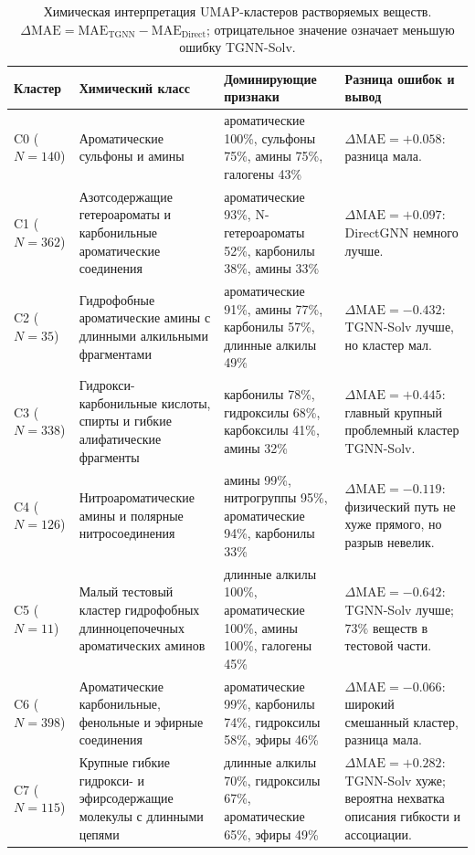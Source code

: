 \documentclass[11pt]{article}
\newcommand{\mae}{\mathrm{MAE}}
\theoremstyle{definition}
\begin{document}
\begin{table}[!htbp]
\centering
\caption{Химическая интерпретация UMAP-кластеров растворяемых веществ. \(\Delta\mae=\mae_{\mathrm{TGNN}}-\mae_{\mathrm{Direct}}\); отрицательное значение означает меньшую ошибку TGNN-Solv.}
\label{tab:umap-cluster-classes}
\footnotesize
\begin{tabularx}{\textwidth}{C{0.12\textwidth} P{0.31\textwidth} P{0.30\textwidth} Y}
\toprule
Кластер & Химический класс & Доминирующие признаки & Разница ошибок и вывод \\
\midrule
C0 (\(N=140\)) & Ароматические сульфоны и амины & ароматические 100\%, сульфоны 75\%, амины 75\%, галогены 43\% & \(\Delta\mae=+0.058\): разница мала. \\
C1 (\(N=362\)) & Азотсодержащие гетероароматы и карбонильные ароматические соединения & ароматические 93\%, N-гетероароматы 52\%, карбонилы 38\%, амины 33\% & \(\Delta\mae=+0.097\): DirectGNN немного лучше. \\
C2 (\(N=35\)) & Гидрофобные ароматические амины с длинными алкильными фрагментами & ароматические 91\%, амины 77\%, карбонилы 57\%, длинные алкилы 49\% & \(\Delta\mae=-0.432\): TGNN-Solv лучше, но кластер мал. \\
C3 (\(N=338\)) & Гидрокси-карбонильные кислоты, спирты и гибкие алифатические фрагменты & карбонилы 78\%, гидроксилы 68\%, карбоксилы 41\%, амины 32\% & \(\Delta\mae=+0.445\): главный крупный проблемный кластер TGNN-Solv. \\
C4 (\(N=126\)) & Нитроароматические амины и полярные нитросоединения & амины 99\%, нитрогруппы 95\%, ароматические 94\%, карбонилы 33\% & \(\Delta\mae=-0.119\): физический путь не хуже прямого, но разрыв невелик. \\
C5 (\(N=11\)) & Малый тестовый кластер гидрофобных длинноцепочечных ароматических аминов & длинные алкилы 100\%, ароматические 100\%, амины 100\%, галогены 45\% & \(\Delta\mae=-0.642\): TGNN-Solv лучше; \(73\%\) веществ в тестовой части. \\
C6 (\(N=398\)) & Ароматические карбонильные, фенольные и эфирные соединения & ароматические 99\%, карбонилы 74\%, гидроксилы 58\%, эфиры 46\% & \(\Delta\mae=-0.066\): широкий смешанный кластер, разница мала. \\
C7 (\(N=115\)) & Крупные гибкие гидрокси- и эфирсодержащие молекулы с длинными цепями & длинные алкилы 70\%, гидроксилы 67\%, ароматические 65\%, эфиры 49\% & \(\Delta\mae=+0.282\): TGNN-Solv хуже; вероятна нехватка описания гибкости и ассоциации. \\
\bottomrule
\end{tabularx}
\end{table}
\end{document}
